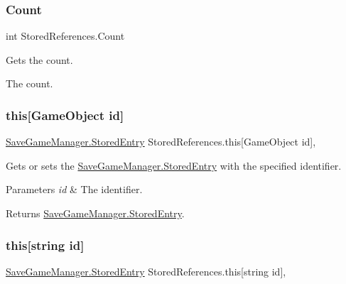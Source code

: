\subsubsection{\texorpdfstring{Count}{Count}}
{\footnotesize\ttfamily int Stored\+References.\+Count\hspace{0.3cm}{\ttfamily [get]}}



Gets the count. 

The count.\mbox{\label{class_stored_references_a01fd40bb59a909c460f5d08a5adae4c9}} 
\subsubsection{\texorpdfstring{this[Game\+Object id]}{this[GameObject id]}}
{\footnotesize\ttfamily \hyperlink{class_save_game_manager_1_1_stored_entry}{Save\+Game\+Manager.\+Stored\+Entry} Stored\+References.\+this\mbox{[}Game\+Object id\mbox{]}\hspace{0.3cm}{\ttfamily [get]}, {\ttfamily [set]}}



Gets or sets the \hyperlink{class_save_game_manager_1_1_stored_entry}{Save\+Game\+Manager.\+Stored\+Entry} with the specified identifier. 


\begin{DoxyParams}{Parameters}
{\em id} & The identifier.\\
\hline
\end{DoxyParams}
\begin{DoxyReturn}{Returns}
\hyperlink{class_save_game_manager_1_1_stored_entry}{Save\+Game\+Manager.\+Stored\+Entry}.
\end{DoxyReturn}
\mbox{\label{class_stored_references_ab8dc5c6dbac10be877b2f347dbfbf2ec}} 
\subsubsection{\texorpdfstring{this[string id]}{this[string id]}}
{\footnotesize\ttfamily \hyperlink{class_save_game_manager_1_1_stored_entry}{Save\+Game\+Manager.\+Stored\+Entry} Stored\+References.\+this\mbox{[}string id\mbox{]}\hspace{0.3cm}{\ttfamily [get]}, {\ttfamily [set]}}



